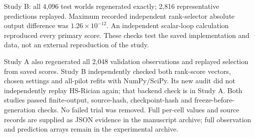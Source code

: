 Study B: all 4,096 test worlds regenerated exactly; 2,816 representative predictions replayed. Maximum recorded independent rank-selector absolute output difference was $1.26\times10^{-12}$. An independent scalar-loop calculation reproduced every primary score. These checks test the saved implementation and data, not an external reproduction of the study.

Study A also regenerated all 2,048 validation observations and replayed selection from saved scores. Study B independently checked both rank-score vectors, chosen settings and all-pilot refits with NumPy/SciPy. Its new audit did not independently replay HS-Rician again; that backend check is in Study A. Both studies passed finite-output, source-hash, checkpoint-hash and freeze-before-generation checks. No failed trial was removed. Full per-cell values and source records are supplied as JSON evidence in the manuscript archive; full observation and prediction arrays remain in the experimental archive.
